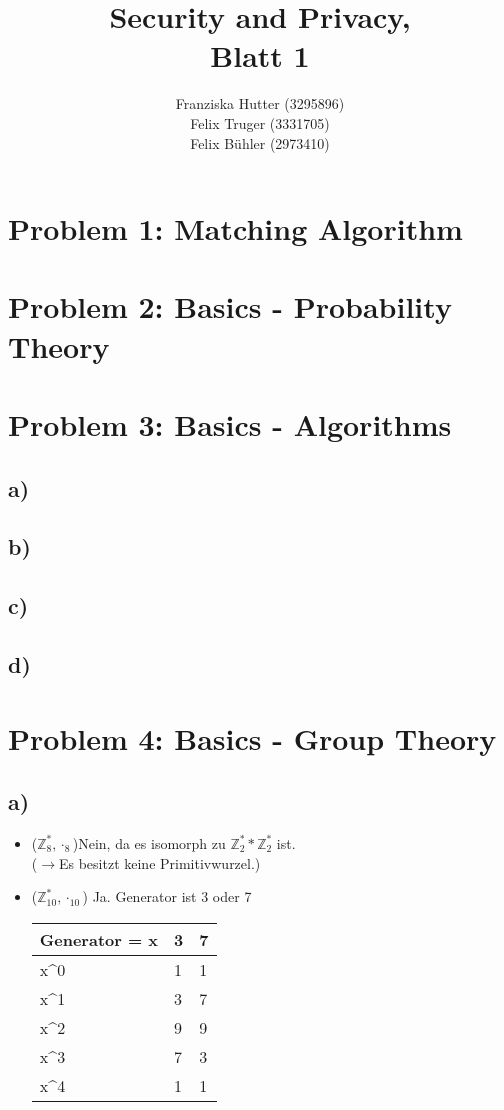 \documentclass[12pt,pdftex,a4paper]{article}
\title{Security and Privacy,\\ Blatt 1}
\author{Franziska Hutter (3295896)\\
	Felix Truger (3331705)\\
	Felix Bühler (2973410)}
\begin{document}
\maketitle
\pagebreak

\section*{Problem 1: Matching Algorithm}

\section*{Problem 2: Basics - Probability Theory}

\section*{Problem 3: Basics - Algorithms}
\subsection*{a)}
\subsection*{b)}
\subsection*{c)}
\subsection*{d)}

\section*{Problem 4: Basics - Group Theory}
\subsection*{a)}
\begin{itemize}
	\item ($ \mathds{Z}^*_{8}, \cdot_{8} $)Nein, da es isomorph zu $ \mathds{Z}^*_2 * \mathds{Z}^*_2 $ ist.\\
	($ \rightarrow $Es besitzt keine Primitivwurzel.)
	\item ($ \mathds{Z}^*_{10}, \cdot_{10} $) Ja. Generator ist 3 oder 7\\
    \begin{table}[!ht]
    	\centering
    	\begin{tabular}{|l|l|l|}
    		\hline
    		Generator = x        & 3 & 7 \\ \hline
    		x\textasciicircum{}0 & 1 & 1 \\ \hline
    		x\textasciicircum{}1 & 3 & 7 \\ \hline
    		x\textasciicircum{}2 & 9 & 9 \\ \hline
    		x\textasciicircum{}3 & 7 & 3 \\ \hline
    		x\textasciicircum{}4 & 1 & 1 \\ \hline
    	\end{tabular}
    \end{table}
\end{itemize}
\end{document}
